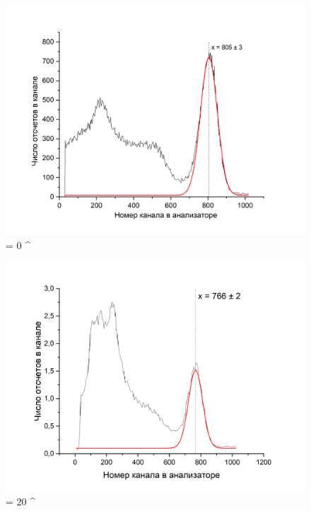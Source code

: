 \documentclass[a4paper,12pt]{article} %
\begin{document}
\begin{figure}[h!]
    \centering
    \includegraphics[scale=0.5]{оцифровка_0.png}
    \caption{\theta = 0 ^\circ}
\end{figure}

\begin{figure}[h!]
    \centering
    \includegraphics[scale=0.5]{оцифровка_20.png}
    \caption{\theta = 20 ^\circ}
\end{figure}
\end{document}

